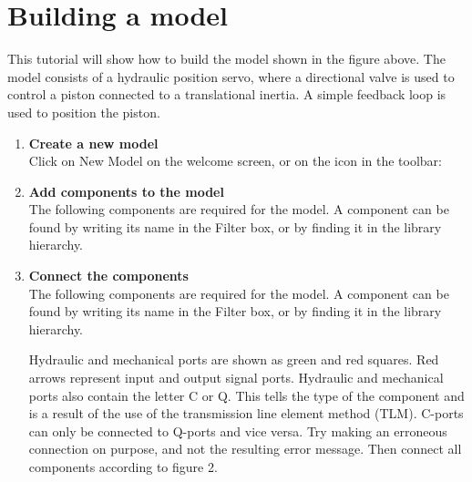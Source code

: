 \documentclass[a4paper]{article}
\begin{document}
\section*{Building a model}
This tutorial will show how to build the model shown in the figure above. The model consists of a hydraulic position servo, where a directional valve is used to control a piston connected to a translational inertia. A simple feedback loop is used to position the piston.
\begin{enumerate}
\item \textbf{Create a new model} \\
Click on New Model on the welcome screen, or on the icon in the toolbar:
 	
 	
\item \textbf{Add components to the model} \\
The following components are required for the model. A component can be found by writing its name in the Filter box, or by finding it in the library hierarchy.

\vspace{5pt}
\vspace{5pt}

\item \textbf{Connect the components} \\
The following components are required for the model. A component can be found by writing its name in the Filter box, or by finding it in the library hierarchy.


Hydraulic and mechanical ports are shown as green and red squares. Red arrows represent input and output signal ports. Hydraulic and mechanical ports also contain the letter C or Q. This tells the type of the component and is a result of the use of the transmission line element method (TLM). C-ports can only be connected to Q-ports and vice versa. Try making an erroneous connection on purpose, and not the resulting error message. Then connect all components according to figure 2.


\end{enumerate}
\end{document}
